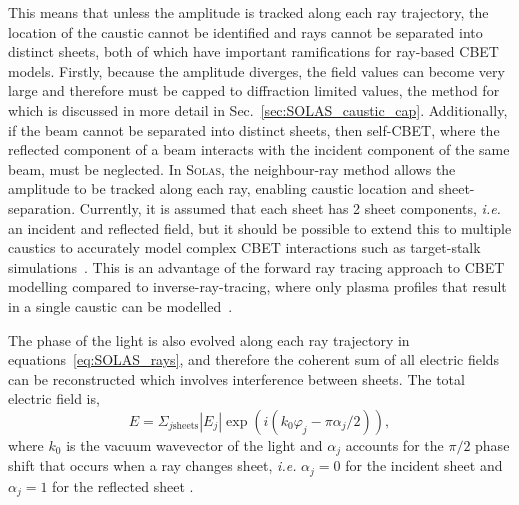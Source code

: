 This means that unless the amplitude is tracked along each ray trajectory, the location of the caustic cannot be identified and rays cannot be separated into distinct sheets, both of which have important ramifications for ray-based \ac{CBET} models.
Firstly, because the amplitude diverges, the field values can become very large and therefore must be capped to diffraction limited values, the method for which is discussed in more detail in Sec.~\ref{sec:SOLAS_caustic_cap}.
Additionally, if the beam cannot be separated into distinct sheets, then self-\ac{CBET}, where the reflected component of a beam interacts with the incident component of the same beam, must be neglected.
In \textsc{Solas}, the neighbour-ray method allows the amplitude to be tracked along each ray, enabling caustic location and sheet-separation.
Currently, it is assumed that each sheet has 2 sheet components, \textit{i.e.} an incident and reflected field, but it should be possible to extend this to multiple caustics to accurately model complex \ac{CBET} interactions such as target-stalk simulations~\cite{igumenshchev_effects_2009,igumenshchev_three-dimensional_2016,gatu_johnson_impact_2020}.
This is an advantage of the forward ray tracing approach to \ac{CBET} modelling compared to inverse-ray-tracing, where only plasma profiles that result in a single caustic can be modelled~\cite{colaitis_inverse_2021}.

The phase of the light is also evolved along each ray trajectory in equations~\ref{eq:SOLAS_rays}, and therefore the coherent sum of all electric fields can be reconstructed which involves interference between sheets.
The total electric field is,
\begin{equation}%
    \label{eq:SOLAS_Ecoherent}
    E = \Sigma_{j \text{sheets}}|E_j|\exp{\left( i(k_0\varphi_j-\pi\alpha_j/2) \right)},
\end{equation}
where $k_0$ is the vacuum wavevector of the light and $\alpha_j$ accounts for the $\pi/2$ phase shift that occurs when a ray changes sheet, \textit{i.e.} $\alpha_j=0$ for the incident sheet and $\alpha_j=1$ for the reflected sheet \cite{follett_validation_2022}.

